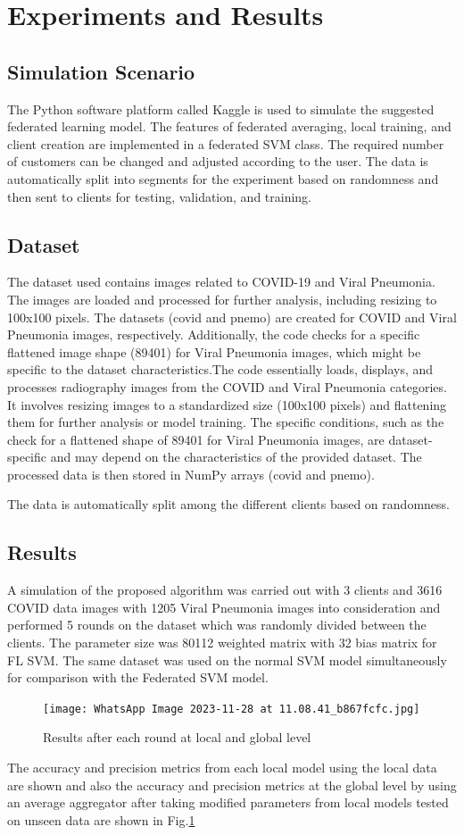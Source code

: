 \documentclass[conference]{IEEEtran}
\begin{document}
\section{Experiments and Results}

\subsection{Simulation Scenario}
The Python software platform called Kaggle is used to simulate the suggested federated learning model. The features of federated averaging, local training, and client creation are implemented in a federated SVM class. The required number of customers can be changed and adjusted according to the user. The data is automatically split into segments for the experiment based on randomness and then sent to clients for testing, validation, and training.

\subsection{Dataset}

The dataset used contains images related to COVID-19 and Viral Pneumonia. The images are loaded and processed for further analysis, including resizing to 100x100 pixels. The datasets (covid and pnemo) are created for COVID and Viral Pneumonia images, respectively. Additionally, the code checks for a specific flattened image shape (89401) for Viral Pneumonia images, which might be specific to the dataset characteristics.The code essentially loads, displays, and processes radiography images from the COVID and Viral Pneumonia categories. It involves resizing images to a standardized size (100x100 pixels) and flattening them for further analysis or model training. The specific conditions, such as the check for a flattened shape of 89401 for Viral Pneumonia images, are dataset-specific and may depend on the characteristics of the provided dataset. The processed data is then stored in NumPy arrays (covid and pnemo).

The data is automatically split among the different clients based on randomness.
\subsection{Results}
A simulation of the proposed algorithm was carried out with 3 clients and 3616 COVID data images with 1205 Viral Pneumonia images into consideration and performed 5 rounds on the dataset which was randomly divided between the clients. The parameter size was 80112 weighted matrix with 32 bias matrix for FL SVM. The same dataset was used on the normal SVM model simultaneously for comparison with the Federated SVM model. 
\begin{figure}[H]
    \centering
    \texttt{[image: WhatsApp Image 2023-11-28 at 11.08.41\_b867fcfc.jpg]}
    \caption{Results after each round at local and global level}
    \label{di2}
\end{figure}
The accuracy and precision metrics from each local model using the local data are shown and also the accuracy and precision metrics at the global level by using an average aggregator after taking modified parameters from local models tested on unseen data are shown in Fig.\ref{di2}
\end{document}

